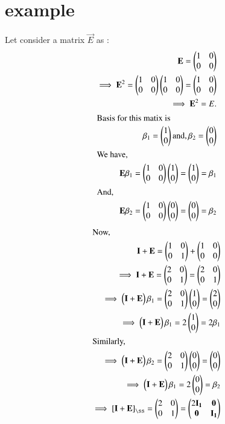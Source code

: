 \documentclass[journal,12pt,twocolumn]{IEEEtran}
\begin{document}
	\section{example}
	Let consider a matrix $\vec{E}$ as :
	\begin{align}
	\mathbf{E} =  \begin{pmatrix}1 & 0 \\ 0 & 0\end{pmatrix}\\
	\implies \mathbf{E}^2 = \begin{pmatrix}1 & 0 \\ 0 & 0\end{pmatrix}\begin{pmatrix}1 & 0 \\ 0 & 0\end{pmatrix} = \begin{pmatrix}1 & 0 \\ 0 & 0\end{pmatrix}\\
\implies \mathbf{E}^2 = E.\\
\intertext{Basis for this matix is}
\beta_1 = \begin{pmatrix}1 \\ 0 \end{pmatrix} \text{and}, \beta_2 = \begin{pmatrix}0 \\0\end{pmatrix}\\
\intertext{We have,} 
\mathbf{E}\beta_1 =\begin{pmatrix}1 & 0 \\ 0 & 0\end{pmatrix} \begin{pmatrix}1 \\ 0\end{pmatrix} = \begin{pmatrix}1 \\ 0 \end{pmatrix} = \beta_1\\
\intertext{And,}
\mathbf{E}\beta_2 = \begin{pmatrix}1 & 0 \\ 0 & 0\end{pmatrix}\begin{pmatrix}0 \\ 0 \end{pmatrix}  =  \begin{pmatrix}0 \\ 0\end{pmatrix}= \beta_2
\end{align}
\begin{align}
\intertext{Now,}
\vec{I}+ \vec{E} = \myvec{1 & 0 \\ 0 & 1} + \myvec{ 1 & 0 \\ 0 & 0}\\
\implies \vec{I} + \vec{E} = \myvec{2 & 0 \\ 0 & 1} = \myvec{2 & 0 \\ 0 &1}\\
\implies \myvec{\vec{I} + \vec{E}} \beta_1 = \myvec{2 & 0 \\ 0 &1}\myvec{1 \\ 0} =  \myvec{2 \\ 0}\\
\implies \myvec{\vec{I} + \vec{E}} \beta_1 = 2 \myvec{1 \\ 0} = 2\beta_1\\
\intertext{Similarly,}
\implies \myvec{\vec{I} + \vec{E}} \beta_2 = \myvec{2 & 0 \\ 0 &1}\myvec{0 \\ 0} =  \myvec{0 \\ 0}\\
\implies \myvec{\vec{I} + \vec{E}} \beta_1 = 2 \myvec{0 \\ 0} = \beta_2\\
\implies \left[ \vec{I} + \vec{E}\right]_{\ss} = \myvec{2 & 0 \\ 0 & 1} = \myvec{2 \vec{I_1} & \vec{0} \\ \vec{0} & \vec{I_1}}
\end{align}	
\end{document}
